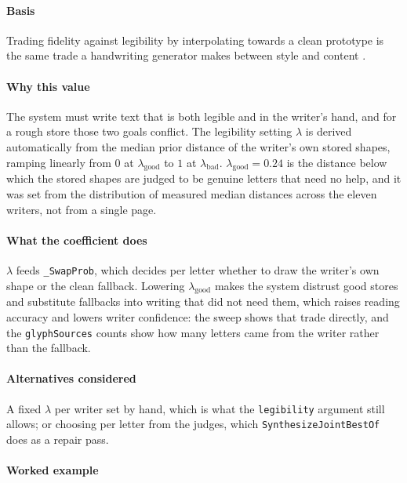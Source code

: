 \paragraph{Basis}

Trading fidelity against legibility by interpolating towards a clean prototype is the same trade a handwriting generator makes between style and content \cite{graves2013,kang2020}.

\paragraph{Why this value}

The system must write text that is both legible and in the writer's hand, and for a rough store those two goals conflict. The legibility setting $\lambda$ is derived automatically from the median prior distance of the writer's own stored shapes, ramping linearly from $0$ at $\lambda_{\text{good}}$ to $1$ at $\lambda_{\text{bad}}$. $\lambda_{\text{good}} = 0.24$ is the distance below which the stored shapes are judged to be genuine letters that need no help, and it was set from the distribution of measured median distances across the eleven writers, not from a single page.

\paragraph{What the coefficient does}

$\lambda$ feeds \texttt{\_SwapProb}, which decides per letter whether to draw the writer's own shape or the clean fallback. Lowering $\lambda_{\text{good}}$ makes the system distrust good stores and substitute fallbacks into writing that did not need them, which raises reading accuracy and lowers writer confidence: the sweep shows that trade directly, and the \texttt{glyphSources} counts show how many letters came from the writer rather than the fallback.

\paragraph{Alternatives considered}

A fixed $\lambda$ per writer set by hand, which is what the \texttt{legibility} argument still allows; or choosing per letter from the judges, which \texttt{SynthesizeJointBestOf} does as a repair pass.

\paragraph{Worked example}


